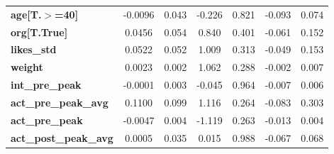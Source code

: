 \begin{center}
\begin{tabular}{lcccccc}
\textbf{age[T.$>$=40]}        &      -0.0096  &        0.043     &    -0.226  &         0.821        &       -0.093    &        0.074     \\
\textbf{org[T.True]}          &       0.0456  &        0.054     &     0.840  &         0.401        &       -0.061    &        0.152     \\
\textbf{likes\_std}           &       0.0522  &        0.052     &     1.009  &         0.313        &       -0.049    &        0.153     \\
\textbf{weight}               &       0.0023  &        0.002     &     1.062  &         0.288        &       -0.002    &        0.007     \\
\textbf{int\_pre\_peak}       &      -0.0001  &        0.003     &    -0.045  &         0.964        &       -0.007    &        0.006     \\
\textbf{act\_pre\_peak\_avg}  &       0.1100  &        0.099     &     1.116  &         0.264        &       -0.083    &        0.303     \\
\textbf{act\_pre\_peak}       &      -0.0047  &        0.004     &    -1.119  &         0.263        &       -0.013    &        0.004     \\
\textbf{act\_post\_peak\_avg} &       0.0005  &        0.035     &     0.015  &         0.988        &       -0.067    &        0.068     \\
\bottomrule
\end{tabular}
\end{center}